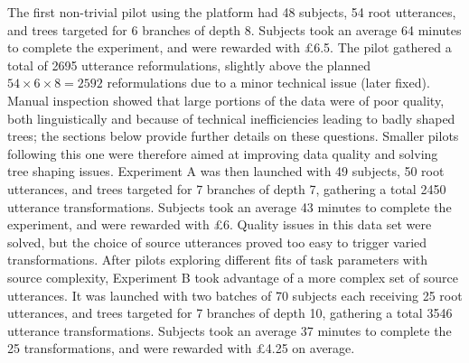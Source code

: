 \documentclass[a4paper,fleqn]{cas-dc}
\begin{document}
The first non-trivial pilot using the platform had 48 subjects, 54 root utterances, and trees targeted for 6
branches of depth 8. Subjects took an average 64 minutes to complete the
experiment, and were rewarded with £6.5. The pilot gathered a total of 2695 utterance reformulations, slightly above the planned \(54 \times 6 \times 8 = 2592\) reformulations due to a minor technical issue (later fixed).
Manual inspection
showed that large portions of the data were of poor quality, both
linguistically and because of technical inefficiencies leading to badly
shaped trees; the sections below provide further details on these
questions. Smaller pilots following this one were therefore aimed at
improving data quality and solving tree shaping issues. Experiment A was then
launched with 49 subjects, 50 root utterances, and trees targeted for 7
branches of depth 7, gathering a total 2450 utterance transformations.
Subjects took an average 43 minutes to complete the experiment, and were
rewarded with £6. Quality issues in this data set were solved, but the
choice of source utterances proved too easy to trigger varied
transformations. After pilots exploring different fits of task
parameters with source complexity, Experiment B took advantage of a more
complex set of source utterances. It was launched with two batches of 70
subjects each receiving 25 root utterances, and trees targeted for 7
branches of depth 10, gathering a total 3546 utterance transformations.
Subjects took an average 37 minutes to complete the 25 transformations,
and were rewarded with £4.25 on average.

\end{document}
